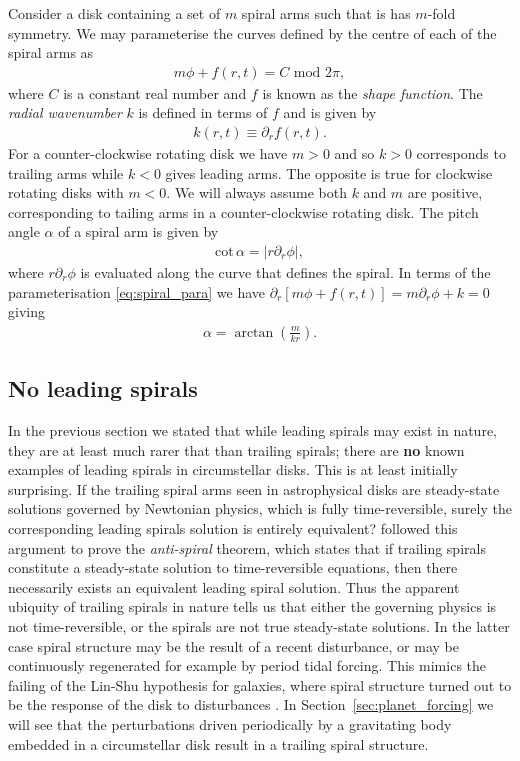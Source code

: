 Consider a disk containing a set of $m$ spiral arms such that is has $m$-fold symmetry. We may parameterise the curves defined by the centre of each of the spiral arms as
\begin{align}
    m\phi + f(r,t) = C \,\, \mathrm{mod} \,\, 2\pi, \label{eq:spiral_para}
\end{align}
where $C$ is a constant real number and $f$ is known as the \textit{shape function}. The \textit{radial wavenumber} $k$ is defined in terms of $f$ and is given by
\begin{align}
    k(r,t) \equiv \partial_r f(r,t).
\end{align}
For a counter-clockwise rotating disk we have $m>0$ and so $k>0$ corresponds to trailing arms while $k<0$ gives leading arms. 
The opposite is true for clockwise rotating disks with $m<0$. 
We will always assume both $k$ and $m$ are positive, corresponding to tailing arms in a counter-clockwise rotating disk. 
The pitch angle $\alpha$ of a spiral arm is given by
\begin{align}
    \mathrm{cot}\,\alpha = \left| r \partial_r \phi \right|,
\end{align}
where $r \partial_r \phi$ is evaluated along the curve that defines the spiral. In terms of the parameterisation \eqref{eq:spiral_para} we have $\partial_r[m\phi+f(r,t)] = m \partial_r \phi + k = 0$ giving
\begin{align}
    \alpha = \arctan \left( \frac{m}{kr} \right). \label{eq:pitchangle}
\end{align}

\subsection{No leading spirals}

In the previous section we stated that while leading spirals may exist in nature, they are at least much rarer that than trailing spirals; there are \textbf{no} known examples of leading spirals in circumstellar disks.
This is at least initially surprising. 
If the trailing spiral arms seen in astrophysical disks are steady-state solutions governed by Newtonian physics, which is fully time-reversible, surely the corresponding leading spirals solution is entirely equivalent?
\citet{lynden-bell1967} followed this argument to prove the \textit{anti-spiral} theorem, which states that if trailing spirals constitute a steady-state solution to time-reversible equations, then there necessarily exists an equivalent leading spiral solution.
Thus the apparent ubiquity of trailing spirals in nature tells us that either the governing physics is not time-reversible, or the spirals are not true steady-state solutions.
In the latter case spiral structure may be the result of a recent disturbance, or may be continuously regenerated for example by period tidal forcing.
This mimics the failing of the Lin-Shu hypothesis for galaxies, where spiral structure turned out to be the response of the disk to disturbances \citep{julian1966}.
In Section~\ref{sec:planet_forcing} we will see that the perturbations driven periodically by a gravitating body embedded in a circumstellar disk result in a trailing spiral structure.

